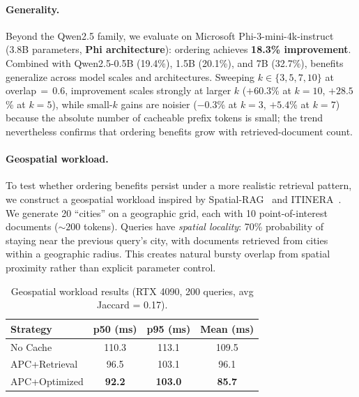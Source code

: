 \documentclass{article}
\begin{document}
\paragraph{Generality.}
Beyond the Qwen2.5 family, we evaluate on Microsoft Phi-3-mini-4k-instruct (3.8B parameters, \textbf{Phi architecture}): ordering achieves \textbf{18.3\% improvement}. Combined with Qwen2.5-0.5B (19.4\%), 1.5B (20.1\%), and 7B (32.7\%), benefits generalize across model scales and architectures. Sweeping $k \in \{3,5,7,10\}$ at overlap\,$=$\,0.6, improvement scales strongly at larger $k$ ($+60.3$\% at $k{=}10$, $+28.5$\% at $k{=}5$), while small-$k$ gains are noisier ($-0.3$\% at $k{=}3$, $+5.4$\% at $k{=}7$) because the absolute number of cacheable prefix tokens is small; the trend nevertheless confirms that ordering benefits grow with retrieved-document count.

\paragraph{Geospatial workload.}
\label{sec:spatial}

To test whether ordering benefits persist under a more realistic retrieval pattern, we construct a geospatial workload inspired by Spatial-RAG~\citep{yu2025spatialrag} and ITINERA~\citep{tang2024itinera}. We generate 20 ``cities'' on a geographic grid, each with 10 point-of-interest documents (${\sim}200$ tokens). Queries have \emph{spatial locality}: 70\% probability of staying near the previous query's city, with documents retrieved from cities within a geographic radius. This creates natural bursty overlap from spatial proximity rather than explicit parameter control.

\begin{table}[t]
\caption{Geospatial workload results (RTX 4090, 200 queries, avg Jaccard = 0.17).}
\label{tab:spatial}
\centering
\small
\begin{tabular}{@{}lccc@{}}
\toprule
\textbf{Strategy} & \textbf{p50 (ms)} & \textbf{p95 (ms)} & \textbf{Mean (ms)} \\
\midrule
No Cache      & 110.3 & 113.1 & 109.5 \\
APC+Retrieval & 96.5  & 103.1 & 96.1  \\
APC+Optimized & \textbf{92.2} & \textbf{103.0} & \textbf{85.7} \\
\bottomrule
\end{tabular}
\vspace{-0.5em}
\end{table}
\end{document}

